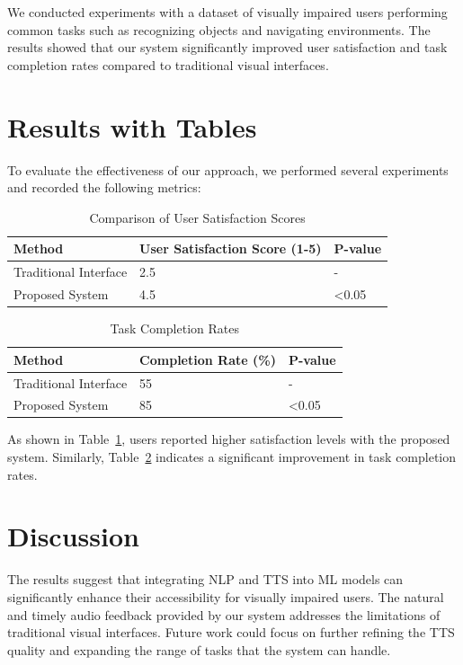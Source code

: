 \documentclass{article}
\begin{document}
We conducted experiments with a dataset of visually impaired users performing common tasks such as recognizing objects and navigating environments. The results showed that our system significantly improved user satisfaction and task completion rates compared to traditional visual interfaces.

\section{Results with Tables}
To evaluate the effectiveness of our approach, we performed several experiments and recorded the following metrics:

\begin{table}[ht]
\centering
\caption{Comparison of User Satisfaction Scores}
\label{tab:satisfaction}
\begin{tabular}{@{}lll@{}}
\toprule
\textbf{Method} & \textbf{User Satisfaction Score (1-5)} & \textbf{P-value} \\ \midrule
Traditional Interface & 2.5 & - \\
Proposed System & 4.5 & <0.05 \\ \bottomrule
\end{tabular}
\end{table}

\begin{table}[ht]
\centering
\caption{Task Completion Rates}
\label{tab:task_completion}
\begin{tabular}{@{}lll@{}}
\toprule
\textbf{Method} & \textbf{Completion Rate (\%)} & \textbf{P-value} \\ \midrule
Traditional Interface & 55 & - \\
Proposed System & 85 & <0.05 \\ \bottomrule
\end{tabular}
\end{table}

As shown in Table~\ref{tab:satisfaction}, users reported higher satisfaction levels with the proposed system. Similarly, Table~\ref{tab:task_completion} indicates a significant improvement in task completion rates.

\section{Discussion}
The results suggest that integrating NLP and TTS into ML models can significantly enhance their accessibility for visually impaired users. The natural and timely audio feedback provided by our system addresses the limitations of traditional visual interfaces. Future work could focus on further refining the TTS quality and expanding the range of tasks that the system can handle.
\end{document}
